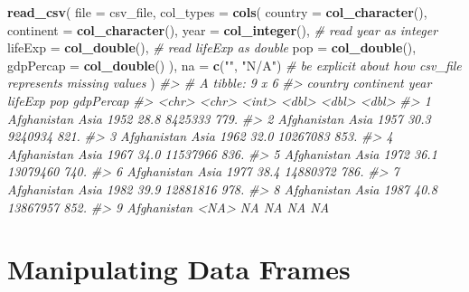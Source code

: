 \documentclass[
]{report}
\newenvironment{Shaded}{\begin{snugshade}}{\end{snugshade}}
\newcommand{\CommentTok}[1]{\textcolor[rgb]{0.56,0.35,0.01}{\textit{#1}}}
\newcommand{\DataTypeTok}[1]{\textcolor[rgb]{0.13,0.29,0.53}{#1}}
\newcommand{\KeywordTok}[1]{\textcolor[rgb]{0.13,0.29,0.53}{\textbf{#1}}}
\newcommand{\NormalTok}[1]{#1}
\newcommand{\StringTok}[1]{\textcolor[rgb]{0.31,0.60,0.02}{#1}}
\begin{document}
\begin{Shaded}
\begin{Highlighting}[]
\KeywordTok{read\_csv}\NormalTok{(}
  \DataTypeTok{file =}\NormalTok{ csv\_file,}
  \DataTypeTok{col\_types =} \KeywordTok{cols}\NormalTok{(}
    \DataTypeTok{country =} \KeywordTok{col\_character}\NormalTok{(),}
    \DataTypeTok{continent =} \KeywordTok{col\_character}\NormalTok{(),}
    \DataTypeTok{year =} \KeywordTok{col\_integer}\NormalTok{(),        }\CommentTok{\# read \textasciigrave{}year\textasciigrave{} as \textasciigrave{}integer\textasciigrave{}}
    \DataTypeTok{lifeExp =} \KeywordTok{col\_double}\NormalTok{(),      }\CommentTok{\# read \textasciigrave{}lifeExp\textasciigrave{} as \textasciigrave{}double\textasciigrave{}}
    \DataTypeTok{pop =} \KeywordTok{col\_double}\NormalTok{(),}
    \DataTypeTok{gdpPercap =} \KeywordTok{col\_double}\NormalTok{()}
\NormalTok{  ),}
  \DataTypeTok{na =} \KeywordTok{c}\NormalTok{(}\StringTok{""}\NormalTok{, }\StringTok{"N/A"}\NormalTok{)              }\CommentTok{\# be explicit about how \textasciigrave{}csv\_file\textasciigrave{} represents missing values}
\NormalTok{)}
\CommentTok{\#\textgreater{} \# A tibble: 9 x 6}
\CommentTok{\#\textgreater{}   country     continent  year lifeExp      pop gdpPercap}
\CommentTok{\#\textgreater{}   \textless{}chr\textgreater{}       \textless{}chr\textgreater{}     \textless{}int\textgreater{}   \textless{}dbl\textgreater{}    \textless{}dbl\textgreater{}     \textless{}dbl\textgreater{}}
\CommentTok{\#\textgreater{} 1 Afghanistan Asia       1952    28.8  8425333      779.}
\CommentTok{\#\textgreater{} 2 Afghanistan Asia       1957    30.3  9240934      821.}
\CommentTok{\#\textgreater{} 3 Afghanistan Asia       1962    32.0 10267083      853.}
\CommentTok{\#\textgreater{} 4 Afghanistan Asia       1967    34.0 11537966      836.}
\CommentTok{\#\textgreater{} 5 Afghanistan Asia       1972    36.1 13079460      740.}
\CommentTok{\#\textgreater{} 6 Afghanistan Asia       1977    38.4 14880372      786.}
\CommentTok{\#\textgreater{} 7 Afghanistan Asia       1982    39.9 12881816      978.}
\CommentTok{\#\textgreater{} 8 Afghanistan Asia       1987    40.8 13867957      852.}
\CommentTok{\#\textgreater{} 9 Afghanistan \textless{}NA\textgreater{}         NA    NA         NA       NA}
\end{Highlighting}
\end{Shaded}

\hypertarget{manipulating-data-frames}{%
\chapter{Manipulating Data Frames}\label{manipulating-data-frames}}
\end{document}
